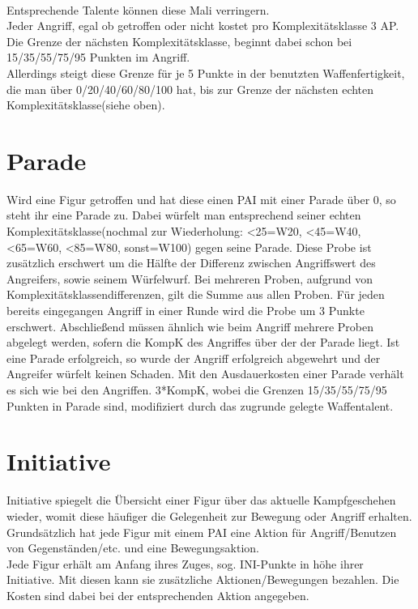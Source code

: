\documentclass[a4paper,12pt,oneside]{book}
\begin{document}
\\Entsprechende Talente können diese Mali verringern.
\\Jeder Angriff, egal ob getroffen oder nicht kostet pro Komplexitätsklasse 3 AP. Die Grenze der nächsten Komplexitätsklasse, beginnt dabei schon bei 15/35/55/75/95 Punkten im Angriff. 
\\Allerdings steigt diese Grenze für je 5 Punkte in der benutzten Waffenfertigkeit, die man über 0/20/40/60/80/100 hat, bis zur Grenze der nächsten echten Komplexitätsklasse(siehe oben). 

\section{Parade}
Wird eine Figur getroffen und hat diese einen PAI mit einer Parade über 0, so steht ihr eine Parade zu. Dabei würfelt man entsprechend seiner echten Komplexitätsklasse(nochmal zur Wiederholung: \textless25=W20, \textless45=W40, \textless65=W60, \textless85=W80, sonst=W100) gegen seine Parade. Diese Probe ist zusätzlich erschwert um die Hälfte der Differenz zwischen Angriffswert des Angreifers, sowie seinem Würfelwurf. 
Bei mehreren Proben, aufgrund von Komplexitätsklassendifferenzen, gilt die Summe aus allen Proben. Für jeden bereits eingegangen Angriff in einer Runde wird die Probe um 3 Punkte erschwert. Abschließend müssen ähnlich wie beim Angriff mehrere Proben abgelegt werden, sofern die KompK des Angriffes über der der Parade liegt.
Ist eine Parade erfolgreich, so wurde der Angriff erfolgreich abgewehrt und der Angreifer würfelt keinen Schaden.
Mit den Ausdauerkosten einer Parade verhält es sich wie bei den Angriffen. 3*KompK, wobei die Grenzen 15/35/55/75/95 Punkten in Parade sind, modifiziert durch das zugrunde gelegte Waffentalent.

\section{Initiative}
Initiative spiegelt die Übersicht einer Figur über das aktuelle Kampfgeschehen wieder, womit diese häufiger die Gelegenheit zur Bewegung oder Angriff erhalten. Grundsätzlich hat jede Figur mit einem PAI eine Aktion für Angriff/Benutzen von Gegenständen/etc. und eine Bewegungsaktion.
\\Jede Figur erhält am Anfang ihres Zuges, sog. INI-Punkte in höhe ihrer Initiative. Mit diesen kann sie zusätzliche Aktionen/Bewegungen bezahlen. Die Kosten sind dabei bei der entsprechenden Aktion angegeben.
\end{document}
